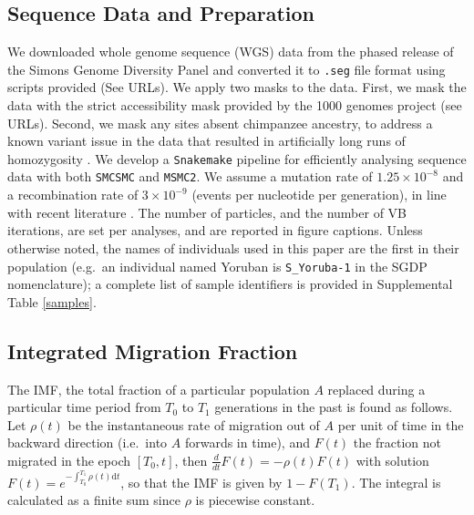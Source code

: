 \subsection{Sequence Data and Preparation}  We downloaded whole genome sequence (WGS) data from the phased release of the Simons Genome Diversity Panel and converted it to {\tt .seg} file format using scripts provided (See URLs). We apply two masks to the data. First, we mask the data with the strict accessibility mask provided by the 1000 genomes project (see URLs). Second, we mask any sites absent chimpanzee ancestry, to address a known variant issue in the data that resulted in artificially long runs of homozygosity \cite{Wang2019a}. We develop a {\tt Snakemake} \cite{Koster2012} pipeline for efficiently analysing sequence data with both {\tt SMCSMC} and {\tt MSMC2}. We assume a mutation rate of $1.25\times10^{-8}$ and a recombination rate of $3\times10^{-9}$ (events per nucleotide per generation), in line with recent literature \cite{Scally2012, Schiffels2014a}. The number of particles, and the number of VB iterations, are set per analyses, and are reported in figure captions. Unless otherwise noted, the names of individuals used in this paper are the first in their population (e.g.\ an individual named Yoruban is {\tt S\_Yoruba-1} in the SGDP nomenclature); a complete list of sample identifiers is provided in Supplemental Table \ref{samples}. 



\subsection{Integrated Migration Fraction}
The IMF, the total fraction of a particular population $A$ replaced during a particular time period from $T_0$ to $T_1$ generations in the past is found as follows. Let $\rho(t)$ be the instantaneous rate of migration out of $A$ per unit of time in the backward direction (i.e.\ into $A$ forwards in time), and $F(t)$ the fraction not migrated in the epoch $[T_0,t]$, then $\frac{d}{dt} F(t) = -\rho(t) F(t)$ with solution $F(t) = e^{- \int_{T_0}^{T_1} \rho(t) {\mathrm{d}t}}$, so that the IMF is given by $1-F(T_1)$.  The integral is calculated as a finite sum since $\rho$ is piecewise constant.
